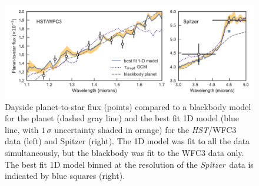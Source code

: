 \documentclass[twocolumn, trackchanges]{aastex61}
\newcommand{\project}[1]{\textsl{#1}}
\newcommand{\HST}{\project{HST}}
\newcommand{\Spitzer}{\project{Spitzer}}
\begin{document}
\begin{figure}
\includegraphics[width = 1.0\textwidth]{fig7.pdf}
\caption{Dayside planet-to-star flux (points) compared to a blackbody model for the planet (dashed gray line) and the best fit 1D model (blue line, with $1\,\sigma$ uncertainty shaded in orange) for the \HST/WFC3 data (left) and Spitzer (right). The 1D model was fit to all the data simultaneously, but the blackbody was fit to the WFC3 data only. The best fit 1D model binned at the resolution of the \Spitzer\ data is indicated by blue squares (right).} 
\label{fig:dayside}
\end{figure}
\end{document}
